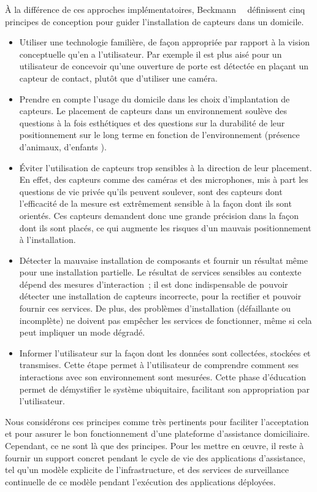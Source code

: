 À la différence de ces approches implémentatoires, Beckmann~\etal~\parencite{beckmann2004some} 
définissent cinq principes de conception pour guider l'installation de 
capteurs dans un domicile.
\begin{itemize} 
\item Utiliser une technologie familière, de façon appropriée par rapport à la 
vision conceptuelle qu'en a l'utilisateur. Par exemple il est plus aisé pour un 
utilisateur de concevoir qu'une ouverture de porte est détectée en plaçant un 
capteur de contact, plutôt que d'utiliser une caméra.
\item Prendre en compte l'usage du domicile dans les choix 
d'implantation de capteurs. Le placement de capteurs dans un environnement 
soulève des questions à la fois esthétiques et des questions sur la durabilité 
de leur positionnement sur le long terme en fonction de l'environnement 
(\eg présence d'animaux, d'enfants \etc).
\item Éviter l'utilisation de capteurs trop sensibles à la direction de leur 
placement. En effet, des capteurs comme des caméras et des microphones, mis à 
part les questions de vie privée qu'ils peuvent soulever, sont des capteurs dont 
l'efficacité de la mesure est extrêmement sensible à la façon dont ils sont 
orientés. Ces capteurs demandent donc une grande précision dans la façon dont 
ils sont placés, ce qui augmente les risques d'un mauvais positionnement à 
l'installation.
\item Détecter la mauvaise installation de composants et fournir un résultat 
même pour une installation partielle. Le résultat de services sensibles au 
contexte dépend des mesures d'interaction~; il est donc indispensable de pouvoir 
détecter une installation de capteurs incorrecte, pour la rectifier et pouvoir 
fournir ces services. De plus, des problèmes d'installation (défaillante ou 
incomplète) ne doivent pas empêcher les services de fonctionner, même si cela 
peut impliquer un mode dégradé.
\item Informer l'utilisateur sur la façon dont les données sont collectées, 
stockées et transmises. Cette étape permet à l'utilisateur de comprendre comment 
ses interactions avec son environnement sont mesurées. Cette phase d'éducation 
permet de démystifier le système ubiquitaire, facilitant son appropriation par 
l'utilisateur. 
\end{itemize}
Nous considérons ces principes comme très pertinents pour faciliter l'acceptation et pour assurer le bon fonctionnement
d'une plateforme d'assistance domiciliaire.
Cependant, ce ne sont là que des principes. Pour les mettre en {\oe}uvre, il reste à fournir un support concret pendant
le cycle de vie des applications d'assistance, tel qu'un modèle explicite de l'infrastructure, et des services de surveillance
continuelle de ce modèle pendant l'exécution des applications déployées.


